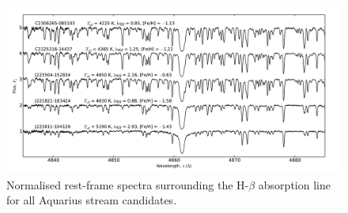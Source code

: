 \documentclass{emulateapj}
\begin{document}
\begin{figure}[t!]
	\includegraphics[width=\textwidth]{./figures/spectra-sample.pdf}
	\caption{Normalised rest-frame spectra surrounding the H-$\beta$ absorption line for all Aquarius stream candidates.}
	\label{fig:spectra}
\end{figure}
\end{document}
